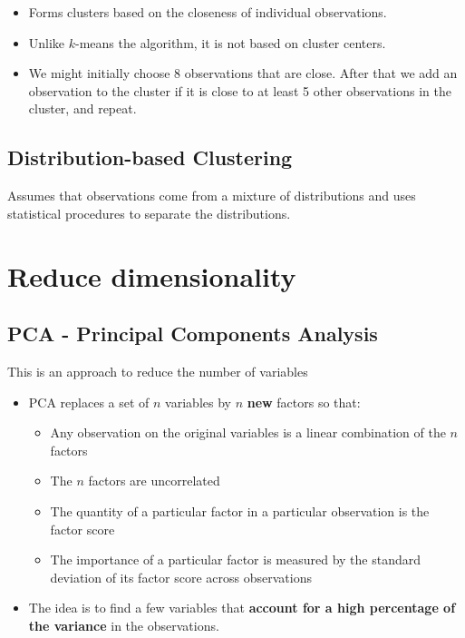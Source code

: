 \begin{itemize}
    \item Forms clusters based on the closeness of individual observations.
    \item Unlike $k$-means the algorithm, it is not based on cluster centers.
    \item We might initially choose 8 observations that are close. After that we add an observation to the cluster if it is close to at least 5 other observations in the cluster, and repeat. 
\end{itemize}

\subsection{Distribution-based Clustering}

Assumes that observations come from a mixture of distributions and uses statistical procedures to separate the distributions.

\section{Reduce dimensionality}

\subsection{PCA - Principal Components Analysis}

This is an approach to reduce the number of variables
\begin{itemize}
    \item PCA replaces a set of $n$ variables by $n$ \textbf{new} factors so that:
          \begin{itemize}
              \item Any observation on the original variables is a linear combination of the $n$ factors
              \item The $n$ factors are uncorrelated
              \item The quantity of a particular factor in a particular observation is the factor score
              \item The importance of a particular factor is measured by the standard deviation of its factor score across observations \ 
          \end{itemize}
    \item The idea is to find a few variables that \textbf{account for a high percentage of the variance} in the observations.
\end{itemize}

